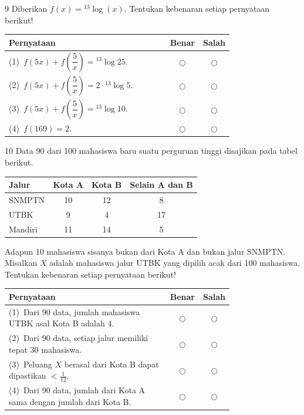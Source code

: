 \documentclass[11pt]{article}
\begin{document}
\begin{soal}{9}
Diberikan $f(x)={}^{13}\!\log(x)$.
Tentukan kebenaran setiap pernyataan berikut!

\par\smallskip
{\renewcommand{\arraystretch}{1.4}%
\begin{tabular}{@{}p{0.76\linewidth}cc@{}}
\hline
\textbf{Pernyataan} & \textbf{Benar} & \textbf{Salah}\\
\hline
(1)~$f(5x)+f\!\left(\dfrac{5}{x}\right)={}^{13}\!\log 25$.
  & $\bigcirc$ & $\bigcirc$\\[6pt]
(2)~$f(5x)+f\!\left(\dfrac{5}{x}\right)=2\cdot{}^{13}\!\log 5$.
  & $\bigcirc$ & $\bigcirc$\\[6pt]
(3)~$f(5x)+f\!\left(\dfrac{5}{x}\right)={}^{13}\!\log 10$.
  & $\bigcirc$ & $\bigcirc$\\[6pt]
(4)~$f(169)=2$.
  & $\bigcirc$ & $\bigcirc$\\
\hline
\end{tabular}}
\end{soal}

\begin{soal}{10}
Data 90 dari 100 mahasiswa baru suatu perguruan tinggi disajikan
pada tabel berikut.
\begin{center}
\begin{tabular}{l|ccc}
\hline
Jalur   & Kota A & Kota B & Selain A dan B \\
\hline
SNMPTN  & 10 & 12 &  8 \\
UTBK    &  9 &  4 & 17 \\
Mandiri & 11 & 14 &  5 \\
\hline
\end{tabular}
\end{center}
Adapun 10 mahasiswa sisanya bukan dari Kota A dan bukan jalur SNMPTN.
Misalkan $X$ adalah mahasiswa jalur UTBK yang dipilih acak dari 100
mahasiswa. Tentukan kebenaran setiap pernyataan berikut!

\par\smallskip
{\renewcommand{\arraystretch}{1.4}%
\begin{tabular}{@{}p{0.76\linewidth}cc@{}}
\hline
\textbf{Pernyataan} & \textbf{Benar} & \textbf{Salah}\\
\hline
(1)~Dari 90 data, jumlah mahasiswa UTBK asal Kota B adalah 4.
  & $\bigcirc$ & $\bigcirc$\\
(2)~Dari 90 data, setiap jalur memiliki tepat 30 mahasiswa.
  & $\bigcirc$ & $\bigcirc$\\
(3)~Peluang $X$ berasal dari Kota B dapat dipastikan $<\tfrac{1}{12}$.
  & $\bigcirc$ & $\bigcirc$\\
(4)~Dari 90 data, jumlah dari Kota A sama dengan jumlah dari Kota B.
  & $\bigcirc$ & $\bigcirc$\\
\hline
\end{tabular}}
\end{soal}
\end{document}
